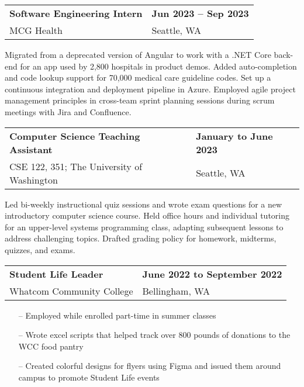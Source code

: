 \documentclass[11pt,letterpaper]{article}
\begin{document}
\begin{tabularx}{\textwidth}{lX}
    \textbf{Software Engineering Intern} & \hfill \textbf{Jun 2023 -- Sep 2023} \\[0pt]
    \small
    MCG Health & \hfill Seattle, WA \\[0pt]
\end{tabularx}
\begin{itemize}
    \small Migrated from a deprecated version of Angular to work with a .NET Core back-end for an app used by 2,800 hospitals in product demos. Added auto-completion and code lookup support for 70,000 medical care guideline codes. Set up a continuous integration and deployment pipeline in Azure. Employed agile project management principles in cross-team sprint planning sessions during scrum meetings with Jira and Confluence.
\end{itemize}

\begin{tabularx}{\textwidth}{lX}
    \textbf{Computer Science Teaching Assistant} & \hfill \textbf{January to June 2023} \\[0pt]
    \small
    CSE 122, 351; The University of Washington & \hfill Seattle, WA \\[0pt]
\end{tabularx}
\begin{itemize}
    \small Led bi-weekly instructional quiz sessions and wrote exam questions for a new introductory computer science course. Held office hours and individual tutoring for an upper-level systems programming class, adapting subsequent lessons to address challenging topics. Drafted grading policy for homework, midterms, quizzes, and exams.
\end{itemize}

\begin{tabularx}{\textwidth}{lX}
    \textbf{Student Life Leader} & \hfill \textbf{June 2022 to September 2022} \\[0pt]
    \small
    Whatcom Community College & \hfill Bellingham, WA \\[0pt]
\end{tabularx}
\begin{itemize}
    \small
    \item[--] Employed while enrolled part-time in summer classes
    \item[--] Wrote excel scripts that helped track over 800 pounds of donations to the WCC food pantry
    \item[--] Created colorful designs for flyers using Figma and issued them around campus to promote Student Life events
\end{itemize}
\end{document}
